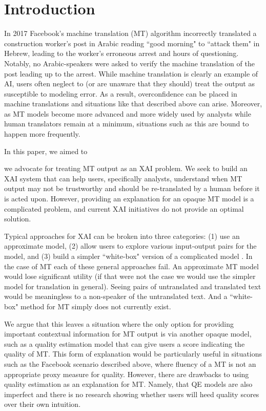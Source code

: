 \section{Introduction}

In 2017 Facebook's machine translation (MT) algorithm incorrectly translated a construction worker's post in Arabic reading ``good morning" to ``attack them" in Hebrew, leading to the worker's erroneous arrest and hours of questioning. Notably, no Arabic-speakers were asked to verify the machine translation of the  post leading up to the arrest\cite{hernFacebook2017}. While machine translation is clearly an example of AI, users often neglect to (or are unaware that they should) treat the output as susceptible to modeling error. As a result, overconfidence can be placed in machine translations and situations like that described above can arise. Moreover, as MT models become more advanced and more widely used by analysts while human translators remain at a minimum, situations such as this are bound to happen more frequently.  

In this paper, we aimed to 

we advocate for treating MT output as an XAI problem. We seek to build an XAI system that can help users, specifically analysts, understand when MT output may not be trustworthy and should be re-translated by a human before it is acted upon. However, providing an explanation for an opaque  MT model is a complicated problem, and current XAI initiatives do not provide an optimal solution.   

Typical approaches for XAI can be broken into three categories: (1) use an approximate model, (2) allow users to explore various input-output pairs for the model, and (3) build a simpler ``white-box" version of a complicated model \cite{RiberoLIME2016, SelbstBarocasIntuitive2018, MittelstadtRussellExplain2019}. In the case of MT each of these general approaches fail. An approximate MT model would lose significant utility (if that were not the case we would use the simpler model for translation in general). Seeing pairs of untranslated and translated text would be meaningless to a non-speaker of the untranslated text. And a ``white-box" method for MT simply does not currently exist.      

We argue that this leaves a situation where the only option for providing important contextual information for MT output is via another opaque model, such as a quality estimation model that can give users a score indicating the quality of MT. This form of explanation would be particularly useful in situations such as the Facebook scenario described above, where fluency of a MT is not an appropriate proxy measure for quality. However, there are drawbacks to using quality estimation as an explanation for MT. Namely, that QE models are also imperfect and there is no research showing whether users will heed quality scores over their own intuition.  

